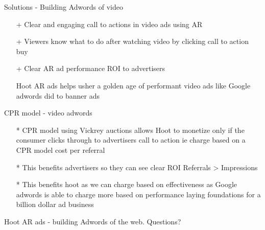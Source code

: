 \documentclass[10pt]{beamer}
\begin{document}
\begin{frame}[fragile]{Solutions - Building Adwords of video}
\begin{itemize}
\item[+]Clear and engaging call to actions in video ads using AR
\item[+]Viewers know what to do after watching video by clicking call to action buy 
\item[+]Clear AR ad performance ROI to advertisers 

Hoot AR ads helps usher a golden age of performant video ads like Google adwords did to banner ads

\end{itemize}


\end{frame}
\begin{frame}[t]{CPR model - video adwords}
\begin{itemize}
\item[*]CPR model using Vickrey auctions allows Hoot to monetize only if the consumer clicks through to advertisers call to action ie charge based on a CPR model cost per referral
\item[*]This benefits advertisers so they can see clear ROI Referrals > Impressions
\item[*]This benefits hoot as we can charge based on effectiveness as Google adwords is able to charge more based on performance laying foundations for a billion dollar ad business
\end{itemize}
\end{frame}
\begin{frame}[standout]
  Hoot AR ads - building Adwords of the web. Questions?
\end{frame}
\end{document}
